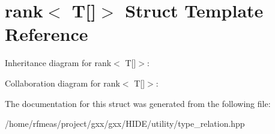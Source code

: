 \hypertarget{structrank_3_01T[]_4}{}\section{rank$<$ T\mbox{[}\mbox{]}$>$ Struct Template Reference}
\label{structrank_3_01T[]_4}


Inheritance diagram for rank$<$ T\mbox{[}\mbox{]}$>$\+:


Collaboration diagram for rank$<$ T\mbox{[}\mbox{]}$>$\+:


The documentation for this struct was generated from the following file\+:\begin{DoxyCompactItemize}
\item 
/home/rfmeas/project/gxx/gxx/\+H\+I\+D\+E/utility/type\+\_\+relation.\+hpp\end{DoxyCompactItemize}
